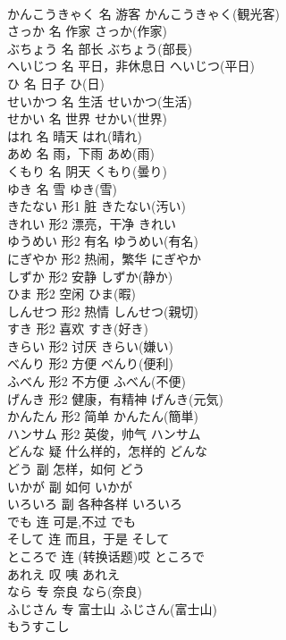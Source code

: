 \documentclass[8pt]{extreport}
\begin{document}
\begin{CJK}{UTF8}{min}
\\	かんこうきゃく	名	游客	かんこうきゃく(観光客)	
\\	さっか	名	作家	さっか(作家)	
\\	ぶちょう	名	部长	ぶちょう(部長)	
\\	へいじつ	名	平日，非休息日	へいじつ(平日)	
\\	ひ	名	日子	ひ(日)	
\\	せいかつ	名	生活	せいかつ(生活)	
\\	せかい	名	世界	せかい(世界)	
\\	はれ	名	晴天	はれ(晴れ)	
\\	あめ	名	雨，下雨	あめ(雨)	
\\	くもり	名	阴天	くもり(曇り)	
\\	ゆき	名	雪	ゆき(雪)	
\\	きたない	形1	脏	きたない(汚い)	
\\	きれい	形2	漂亮，干净	きれい	
\\	ゆうめい	形2	有名	ゆうめい(有名)	
\\	にぎやか	形2	热闹，繁华	にぎやか	
\\	しずか	形2	安静	しずか(静か)	
\\	ひま	形2	空闲	ひま(暇)	
\\	しんせつ	形2	热情	しんせつ(親切)	
\\	すき	形2	喜欢	すき(好き)	
\\	きらい	形2	讨厌	きらい(嫌い)	
\\	べんり	形2	方便	べんり(便利)	
\\	ふべん	形2	不方便	ふべん(不便)	
\\	げんき	形2	健康，有精神	げんき(元気)	
\\	かんたん	形2	简单	かんたん(簡単)	
\\	ハンサム	形2	英俊，帅气	ハンサム	
\\	どんな	疑	什么样的，怎样的	どんな	
\\	どう	副	怎样，如何	どう	
\\	いかが	副	如何	いかが	
\\	いろいろ	副	各种各样	いろいろ	
\\	でも	连	可是,不过	でも	
\\	そして	连	而且，于是	そして	
\\	ところで	连	(转换话题)哎	ところで	
\\	あれえ	叹	咦	あれえ	
\\	なら	专	奈良	なら(奈良)	
\\	ふじさん	专	富士山	ふじさん(富士山)	
\\	もうすこし	

\end{CJK}
\end{document}

